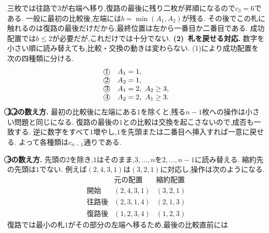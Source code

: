 \begin{enumerate}[label=\textbf{問\arabic*.},leftmargin=3.8em,format=\bookitemlink{practice-entrance}{solution}{problem}]
                  三枚では往路で$3$が右端へ移り,復路の最後に残り二枚が昇順になるので$c_3=6$である.
                  一般に最初の比較後,左端には$b=\min(A_1,A_2)$が残る.
                  その後でこの札に触れるのは復路の最後だけだから,最終位置は左から一番目か二番目である.
                  成功配置では$b\le2$が必要だが,これだけでは十分でない.
                  \smallskip\textbf{(2)~札を戻せる対応.}
                  数字を小さい順に読み替えても,比較・交換の動きは変わらない.
                  (1)により成功配置を次の四種類に分ける.
                  \[
                  \begin{array}{ll}
                    \text{\textcircled{1}}&A_1=1,\\
                    \text{\textcircled{2}}&A_2=1,\\
                    \text{\textcircled{3}}&A_1=2,\ A_2\ge3,\\
                    \text{\textcircled{4}}&A_2=2,\ A_1\ge3.
                  \end{array}
                  \]
                  \textbf{\textcircled{1},\textcircled{2}の数え方.}
                  最初の比較後に左端にある$1$を除くと,残る$n-1$枚への操作は小さい問題と同じになる.
                  復路の最後の$1$との比較は交換を起こさないので,成否も一致する.
                  逆に数字をすべて$1$増やし,$1$を先頭または二番目へ挿入すれば一意に戻せる.
                  よって各種類は$c_{n-1}$通りである.
                  \par\textbf{\textcircled{3}の数え方.}
                  先頭の$2$を除き,$1$はそのまま,$3,\ldots,n$を$2,\ldots,n-1$に読み替える.
                  縮約先の先頭は$1$でない.
                  例えば$(2,4,3,1)$は$(3,2,1)$に対応し,操作は次のようになる.
                  \[
                  \begin{array}{c|c|c}
                    &\text{元の配置}&\text{縮約配置}\\ \hline
                    \text{開始}&(2,4,3,1)&(3,2,1)\\
                    \text{往路後}&(2,3,1,4)&(2,1,3)\\
                    \text{復路後}&(1,2,3,4)&(1,2,3)
                  \end{array}
                  \]
                  復路では最小の札$1$がその部分の左端へ移るため,最後の比較直前には

\end{enumerate}
